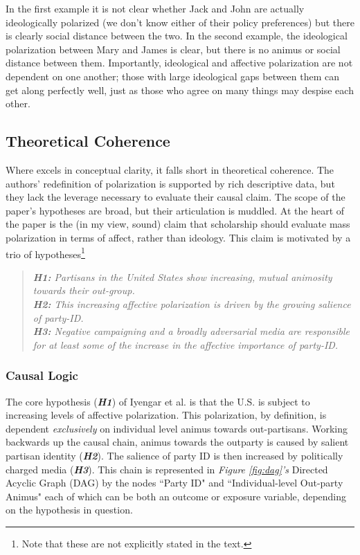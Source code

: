 \documentclass[12pt]{article}
\begin{document}
\noindent In the first example it is not clear whether Jack and John are actually ideologically polarized (we don't know either of their policy preferences) but there is clearly social distance between the two. In the second example, the ideological polarization between Mary and James is clear, but there is no animus or social distance between them. Importantly, ideological and affective polarization are not dependent on one another; those with large ideological gaps between them can get along perfectly well, just as those who agree on many things may despise each other.

\subsection{Theoretical Coherence}
Where \citet{iyengar2012affect} excels in conceptual clarity, it falls short in theoretical coherence. The authors' redefinition of polarization is supported by rich descriptive data, but they lack the leverage necessary to evaluate their causal claim. The scope of the paper's hypotheses are broad, but their articulation is muddled. At the heart of the paper is the (in my view, sound) claim that scholarship should evaluate mass polarization in terms of affect, rather than ideology. This claim is motivated by a trio of hypotheses\footnote{Note that these are not explicitly stated in the text.}

\begin{quote}
\textit{\textbf{H1:} Partisans in the United States show increasing, mutual animosity towards their out-group.}
\\\textit{\textbf{H2:} This increasing affective polarization is driven by the growing salience of party-ID.}
\\\textit{\textbf{H3:} Negative campaigning and a broadly adversarial media are responsible for at least some of the increase in the affective importance of party-ID.}
\end{quote}

\subsubsection{Causal Logic}
The core hypothesis (\textit{\textbf{H1}}) of Iyengar et al. is that the U.S. is subject to increasing levels of affective polarization. This polarization, by definition, is dependent \textit{exclusively} on individual level animus towards out-partisans. Working backwards up the causal chain, animus towards the outparty is caused by salient partisan identity (\textit{\textbf{H2}}). The salience of party ID is then increased by politically charged media (\textit{\textbf{H3}}). This chain is represented in \textit{Figure \ref{fig:dag}'s} Directed Acyclic Graph (DAG) by the nodes ``Party ID" and ``Individual-level Out-party Animus" each of which can be both an outcome or exposure variable, depending on the hypothesis in question.
\end{document}
